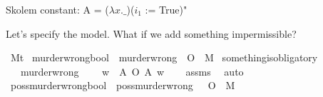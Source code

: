 \begin{isabellebody}
{  Skolem constant:
    A = ($\lambda x. \_$)($i_1$ := True)"%
}\isanewline
%
\isanewline
%
%
\endisatagproof
{\isafoldproof}%
%
\isadelimproof
%
\endisadelimproof
%
\isadelimdocument
%
\endisadelimdocument
%
\isatagdocument
%
\isamarkuptrue%
%
\endisatagdocument
{\isafolddocument}%
%
\isadelimdocument
%
\endisadelimdocument
%
\begin{isamarkuptext}%
Let's specify the model. What if we add something impermissible?%
\end{isamarkuptext}\isamarkuptrue%
\isamarkupfalse%
\ M{\isacharcolon}{\isacharcolon}{\isachardoublequoteopen}t{\isachardoublequoteclose}\isanewline
{}\isamarkupfalse%
\ murder{\isacharunderscore}wrong{\isacharcolon}{\isacharcolon}{\isachardoublequoteopen}bool{\isachardoublequoteclose}\ \ {\isachardoublequoteopen}murder{\isacharunderscore}wrong\ {\isasymequiv}\ {\isasymTurnstile}{\isacharparenleft}O\ {\isacharbraceleft}\isactrlbold {\isasymnot}\ M{\isacharbraceright}{\isacharparenright}{\isachardoublequoteclose}\isanewline
\isanewline
{}\isamarkupfalse%
\ something{\isacharunderscore}is{\isacharunderscore}obligatory{\isacharunderscore}{}{\isacharcolon}\isanewline
\ \ \ murder{\isacharunderscore}wrong\isanewline
\ \ \ {\isachardoublequoteopen}{\isasymforall}\ w{\isachardot}\ {\isasymexists}\ A{\isachardot}\ O\ {\isacharbraceleft}A{\isacharbraceright}\ w{\isachardoublequoteclose}\isanewline
%
\isadelimproof
\ \ %
\endisadelimproof
%
\isatagproof
{}\isamarkupfalse%
\ assms\ \isamarkupfalse%
\ auto\isanewline
%
%
\endisatagproof
{\isafoldproof}%
%
\isadelimproof
\isanewline
%
\endisadelimproof
\isanewline
{}\isamarkupfalse%
\ poss{\isacharunderscore}murder{\isacharunderscore}wrong{\isacharcolon}{\isacharcolon}{\isachardoublequoteopen}bool{\isachardoublequoteclose}\ \ {\isachardoublequoteopen}poss{\isacharunderscore}murder{\isacharunderscore}wrong\ {\isasymequiv}\ {\isasymTurnstile}{\isacharparenleft}{\isasymdiamond}\ {\isacharparenleft}O\ {\isacharbraceleft}\isactrlbold {\isasymnot}\ M{\isacharbraceright}{\isacharparenright}{\isacharparenright}{\isachardoublequoteclose}\isanewline

\end{isabellebody}
